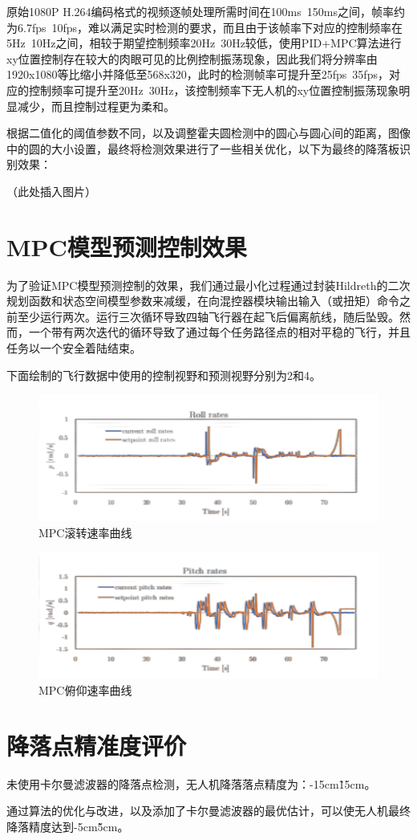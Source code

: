 原始1080P H.264编码格式的视频逐帧处理所需时间在100ms~150ms之间，帧率约为6.7fps~10fps，难以满足实时检测的要求，而且由于该帧率下对应的控制频率在5Hz~10Hz之间，相较于期望控制频率20Hz~30Hz较低，使用PID+MPC算法进行xy位置控制存在较大的肉眼可见的比例控制振荡现象，因此我们将分辨率由1920x1080等比缩小并降低至568x320，此时的检测帧率可提升至25fps~35fps，对应的控制频率可提升至20Hz~30Hz，该控制频率下无人机的xy位置控制振荡现象明显减少，而且控制过程更为柔和。

根据二值化的阈值参数不同，以及调整霍夫圆检测中的圆心与圆心间的距离，图像中的圆的大小设置，最终将检测效果进行了一些相关优化，以下为最终的降落板识别效果：

（此处插入图片）

\section{MPC模型预测控制效果}

为了验证MPC模型预测控制的效果，我们通过最小化过程通过封装Hildreth的二次规划函数和状态空间模型参数来减缓，在向混控器模块输出输入（或扭矩）命令之前至少运行两次。运行三次循环导致四轴飞行器在起飞后偏离航线，随后坠毁。然而，一个带有两次迭代的循环导致了通过每个任务路径点的相对平稳的飞行，并且任务以一个安全着陆结束。

下面绘制的飞行数据中使用的控制视野和预测视野分别为2和4。

\begin{figure}[ht]
  \centering
  \includegraphics[width=0.8\linewidth]{./Figure/MPC-Roll-Rates.png}
  \caption{MPC滚转速率曲线}\label{Fig:xd1}
\end{figure}

\begin{figure}[ht]
  \centering
  \includegraphics[width=0.8\linewidth]{./Figure/MPC-Pitch-Rates.png}
  \caption{MPC俯仰速率曲线}\label{Fig:xd1}
\end{figure}

\section{降落点精准度评价}

未使用卡尔曼滤波器的降落点检测，无人机降落落点精度为：-15cm\~15cm。

通过算法的优化与改进，以及添加了卡尔曼滤波器的最优估计，可以使无人机最终降落精度达到-5cm\~5cm。

